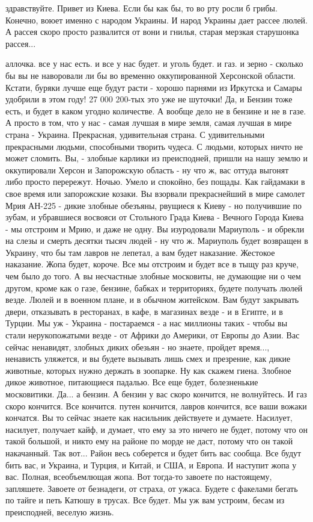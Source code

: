 здравствуйте. Привет из Киева. Если бы как бы, то во рту росли б грибы.
Конечно, воюет именно с народом Украины. И народ Украины дает рассее люлей. А
рассея скоро просто развалится от вони и гнилья, старая мерзкая старушонка
рассея... 

аллочка. все у нас есть. и все у нас будет. и уголь будет. и газ. и зерно -
сколько бы вы не наворовали ли бы во временно оккупированной Херсонской
области. Кстати, буряки лучше еще будут расти - хорошо парнями из Иркутска и
Самары удобрили в этом году! 27 000 200-тых это уже не шуточки! Да, и Бензин
тоже есть, и будет в каком угодно количестве. А вообще дело не в бензине и не в
газе. А просто в том, что у нас - самая лучшая в мире земля, самая лучшая в
мире страна - Украина. Прекрасная, удивительная страна. С удивительными
прекрасными людьми, способными творить чудеса. С людьми, которых ничто не может
сломить. Вы, - злобные карлики из преисподней,  пришли на нашу землю и
оккупировали Херсон и Запорожскую область - ну что ж, вас оттуда выгонят либо
просто перережут. Ночью. Умело и спокойно, без пощады. Как гайдамаки в свое
время или запорожские козаки. Вы взорвали прекраснейший в мире самолет Мрия
АН-225 - дикие злобные обезъяны, рвущиеся к Киеву - но получившие по зубам, и
убравшиеся восвояси от Стольного Града Киева - Вечного Города Киева - мы
отстроим и Мрию, и даже не одну. Вы изуродовали Мариуполь - и обрекли на слезы
и смерть десятки тысяч людей - ну что ж. Мариуполь будет возвращен в Украину,
что бы там лавров не лепетал, а вам будет наказание. Жестокое наказание. Жопа
будет, короче. Все мы отстроим и будет все в тыщу раз круче, чем было до того.
А вы несчастные злобные московиты, не думающие ни о чем другом, кроме как о
газе, бензине, бабках и территориях, будете получать люлей везде. Люлей и в
военном плане, и в обычном житейском. Вам будут закрывать двери, отказывать в
ресторанах, в кафе, в магазинах везде - и в Египте, и в Турции. Мы уж - Украина
- постараемся - а нас миллионы таких - чтобы вы стали нерукопожатыми везде - от
Африки до Америки, от Европы до Азии. Вас сейчас ненавидят, злобных диких
обезьян - но знаете, пройдет время..., ненависть уляжется, и вы будете вызывать
лишь смех и презрение, как дикие животные, которых нужно держать в зоопарке. Ну
как скажем гиена. Злобное дикое животное, питающиеся падалью. Все еще будет,
болезненькие московитики. Да... а бензин. А бензин у вас скоро кончится, не
волнуйтесь. И газ скоро кончится. Все кончится. путен кончится, лавров
кончится, все ваши вожаки кончатся. Вы то сейчас знаете как насильник
действуете и думаете. Насилует, насилует, получает кайф, и думает, что ему за
это ничего не будет, потому что он такой большой, и никто ему на районе по
морде не даст, потому что он такой накачанный. Так вот... Район весь соберется
и будет бить вас сообща. Все будут бить вас, и Украина, и Турция, и Китай, и
США, и Европа. И наступит жопа у вас. Полная, всеобъемлющая жопа. Вот тогда-то
завоете по настоящему, запляшете. Завоете от безнадеги, от страха, от ужаса.
Будете с факелами бегать по тайге и петь Катюшу в трусах. Все будет. Мы уж вам
устроим, бесам из преисподней, веселую жизнь.

